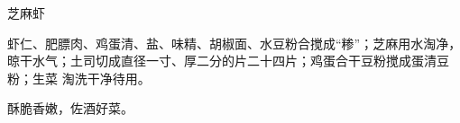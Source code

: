 \begin{recipe}{芝麻虾}

\ingredients


\preparation

\step 虾仁、肥膘肉、鸡蛋清、盐、味精、胡椒面、水豆粉合搅成“糁”；芝麻用水淘净，
晾干水气；土司切成直径一寸、厚二分的片二十四片；鸡蛋合干豆粉搅成蛋清豆粉；生菜
淘洗干净待用。

\features

酥脆香嫩，佐酒好菜。

\end{recipe}

